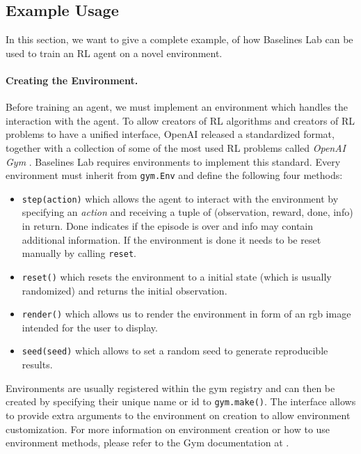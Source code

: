 \subsection{Example Usage} \label{sec:BLExampleUsage}
In this section, we want to give a complete example, of how Baselines Lab can be used to train an RL agent on a novel environment. 

\paragraph{Creating the Environment.} Before training an agent, we must implement an environment which handles the interaction with the agent. To allow creators of RL algorithms and creators of RL problems to have a unified interface, OpenAI released a standardized format, together with a collection of some of the most used RL problems called \textit{OpenAI Gym} \cite{openAIgym}. Baselines Lab requires environments to implement this standard. Every environment must inherit from \texttt{gym.Env} and define the following four methods:

\begin{itemize}
    \item \texttt{step(action)} which allows the agent to interact with the environment by specifying an \textit{action} and receiving a tuple of (observation, reward, done, info) in return. Done indicates if the episode is over and info may contain additional information. If the environment is done it needs to be reset manually by calling \texttt{reset}.
    \item \texttt{reset()} which resets the environment to a initial state (which is usually randomized) and returns the initial observation.
    \item \texttt{render()} which allows us to render the environment in form of an rgb image intended for the user to display.
    \item \texttt{seed(seed)} which allows to set a random seed to generate reproducible results. 
\end{itemize}

Environments are usually registered within the gym registry and can then be created by specifying their unique name or id to \texttt{gym.make()}. The interface allows to provide extra arguments to the environment on creation to allow environment customization. For more information on environment creation or how to use environment methods, please refer to the Gym documentation at \cite{openAIdocumentation}.

